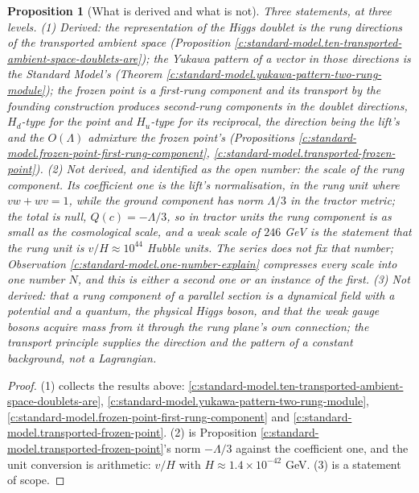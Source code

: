 \documentclass[11pt]{article}
\newtheorem{proposition}[theorem]{Proposition}
\theoremstyle{definition}
\theoremstyle{plain}
\newcommand{\changedmark}[2]{\marginpar{\raggedright\scriptsize\color{#1}#2}}
\begin{document}
\begin{proposition}[What is derived and what is not]\label{c:standard-model.what-derived-what-not}
\changedmark{gray}{reworded}
Three statements, at three levels. (1) \emph{Derived:} the representation of the Higgs doublet is the rung directions of the transported ambient space (Proposition \ref{c:standard-model.ten-transported-ambient-space-doublets-are}); the Yukawa pattern of a vector in those directions is the Standard Model's (Theorem \ref{c:standard-model.yukawa-pattern-two-rung-module}); the frozen point is a first-rung component and its transport by the founding construction produces second-rung components in the doublet directions, $H_{d}$-type for the point and $H_{u}$-type for its reciprocal, the direction being the lift's and the $O(\Lambda)$ admixture the frozen point's (Propositions \ref{c:standard-model.frozen-point-first-rung-component}, \ref{c:standard-model.transported-frozen-point}). (2) \emph{Not derived, and identified as the open number:} the scale of the rung component. Its coefficient one is the lift's normalisation, in the rung unit where $vw + wv = 1$, while the ground component has norm $\Lambda/3$ in the tractor metric; the total is null, $Q(c) = -\Lambda/3$, so in tractor units the rung component is as small as the cosmological scale, and a weak scale of $246$ GeV is the statement that the rung unit is $v/H \approx 10^{44}$ Hubble units. The series does not fix that number; Observation \ref{c:standard-model.one-number-explain} compresses every scale into one number $N$, and this is either a second one or an instance of the first. (3) \emph{Not derived:} that a rung component of a parallel section is a dynamical field with a potential and a quantum, the physical Higgs boson, and that the weak gauge bosons acquire mass from it through the rung plane's own connection; the transport principle supplies the direction and the pattern of a constant background, not a Lagrangian.
\end{proposition}
\begin{proof}
(1) collects the results above: \ref{c:standard-model.ten-transported-ambient-space-doublets-are}, \ref{c:standard-model.yukawa-pattern-two-rung-module}, \ref{c:standard-model.frozen-point-first-rung-component} and \ref{c:standard-model.transported-frozen-point}. (2) is Proposition \ref{c:standard-model.transported-frozen-point}'s norm $-\Lambda/3$ against the coefficient one, and the unit conversion is arithmetic: $v/H$ with $H \approx 1.4 \times 10^{-42}$ GeV. (3) is a statement of scope.

\end{proof}
\end{document}
